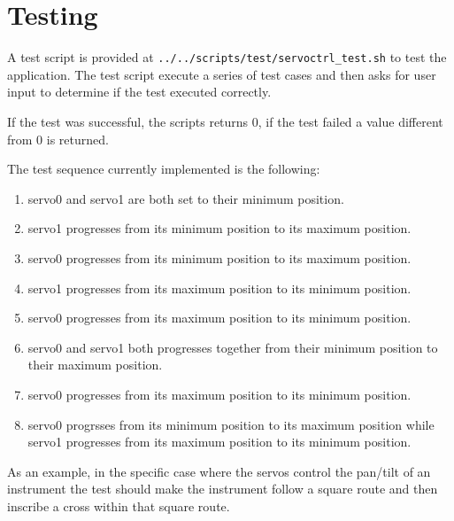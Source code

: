 \section{Testing}
A test script is provided at \texttt{../../scripts/test/servoctrl\_test.sh} to
test the application. The test script execute a series of test cases and then
asks for user input to determine if the test executed correctly.

If the test was successful, the scripts returns 0, if the test failed a value
different from 0 is returned.

The test sequence currently implemented is the following:

   \begin{enumerate}
      \item servo0 and servo1 are both set to their minimum position.
      \item servo1 progresses from its minimum position to its maximum position.
      \item servo0 progresses from its minimum position to its maximum position.
      \item servo1 progresses from its maximum position to its minimum position.
      \item servo0 progresses from its maximum position to its minimum position.
      \item servo0 and servo1 both progresses together from their minimum
         position to their maximum position.
      \item servo0 progresses from its maximum position to its minimum position.
      \item servo0 progrsses from its minimum position to its maximum position
         while servo1 progresses from its maximum position to its minimum
         position.
   \end{enumerate}

As an example, in the specific case where the servos control the pan/tilt of an
instrument the test should make the instrument follow a square route and then
inscribe a cross within that square route.
